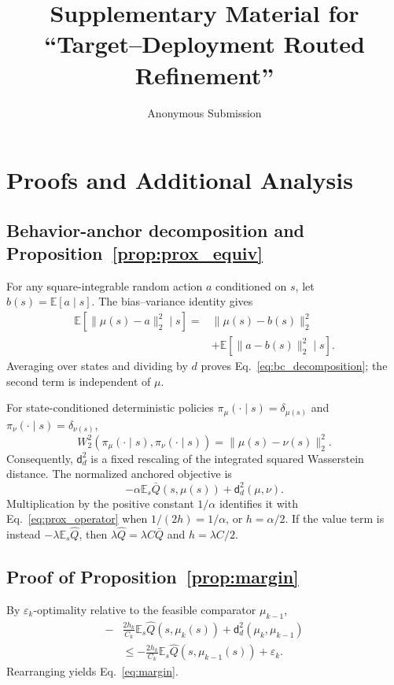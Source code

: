 \documentclass[letterpaper]{article}
\title{Supplementary Material for ``Target--Deployment Routed Refinement''}
\author{Anonymous Submission}
\begin{document}
\maketitle
\appendix

\section{Proofs and Additional Analysis}
\label{app:proofs}

\subsection{Behavior-anchor decomposition and Proposition~\ref{prop:prox_equiv}}
For any square-integrable random action $a$ conditioned on $s$, let
$b(s)=\mathbb E[a\mid s]$. The bias--variance identity gives
\begin{equation}
\begin{split}
\mathbb E[\|\mu(s)-a\|_2^2\mid s]
={}&\|\mu(s)-b(s)\|_2^2\\
&+\mathbb E[\|a-b(s)\|_2^2\mid s].
\end{split}
\end{equation}
Averaging over states and dividing by $d$ proves
Eq.~\eqref{eq:bc_decomposition}; the second term is independent of $\mu$.

For state-conditioned deterministic policies
$\pi_\mu(\cdot\mid s)=\delta_{\mu(s)}$ and
$\pi_\nu(\cdot\mid s)=\delta_{\nu(s)}$,
\begin{equation}
W_2^2(\pi_\mu(\cdot\mid s),\pi_\nu(\cdot\mid s))
=\|\mu(s)-\nu(s)\|_2^2.
\end{equation}
Consequently, $\mathsf d_d^2$ is a fixed rescaling of the integrated squared
Wasserstein distance. The normalized anchored objective is
\begin{equation}
-\alpha\mathbb E_s\bar Q(s,\mu(s))
+\mathsf d_d^2(\mu,\nu).
\end{equation}
Multiplication by the positive constant $1/\alpha$ identifies it with
Eq.~\eqref{eq:prox_operator} when $1/(2h)=1/\alpha$, or $h=\alpha/2$. If the value term
is instead $-\lambda\mathbb E_s\widehat Q$, then
$\lambda\widehat Q=\lambda C\bar Q$ and $h=\lambda C/2$.

\subsection{Proof of Proposition~\ref{prop:margin}}
By $\varepsilon_k$-optimality relative to the feasible comparator
$\mu_{k-1}$,
\begin{equation}
\begin{split}
-&\frac{2h_k}{C_k}\mathbb E_s\widehat Q(s,\mu_k(s))
+\mathsf d_d^2(\mu_k,\mu_{k-1})\\
&\leq
-\frac{2h_k}{C_k}\mathbb E_s\widehat Q(s,\mu_{k-1}(s))
+\varepsilon_k.
\end{split}
\end{equation}
Rearranging yields Eq.~\eqref{eq:margin}.
\end{document}
